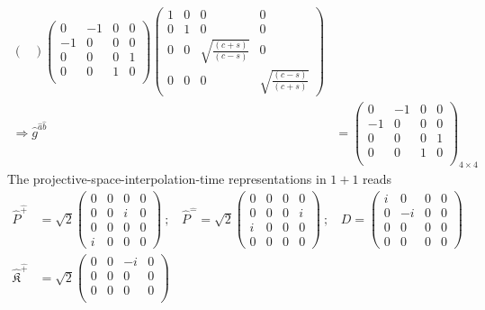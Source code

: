 \documentclass[]{article}
\numberwithin{equation}{section}
\begin{document}
{{\begin{align}
\begin{pmatrix}
    \end{pmatrix}\begin{pmatrix}
  0&-1&0&0\\
  -1&0&0&0\\
  0&0&0&1\\
  0&0&1&0\\
  \end{pmatrix}\begin{pmatrix}
     1&0&0&0\\
     0&1&0&0\\
     0&0&\sqrt{\frac{(c+s)}{(c-s)}}  & 0\\
     0&0&0 & \sqrt{\frac{(c-s)}{(c+s)}} 
    \end{pmatrix}\\
    \Longrightarrow\hat{g}^{\hat{a}\hat{b}}&=\begin{pmatrix}
  0&-1&0&0\\
  -1&0&0&0\\
  0&0&0&1\\
  0&0&1&0\\
  \end{pmatrix}_{4\times4}
\end{align}
The projective-space-interpolation-time representations in $1+1$ reads
\begin{align}
    \hat{P}^{\hat{+}}&=\sqrt{2}\begin{pmatrix}
        0&0&0&0\\
        0&0&i&0\\
        0&0&0&0\\
        i&0&0&0
    \end{pmatrix}~;~~~~\hat{P}^{\hat{-}}=\sqrt{2}\begin{pmatrix}
        0&0&0&0\\
        0&0&0&i\\
        i&0&0&0\\
        0&0&0&0
    \end{pmatrix}~;~~~~D=\begin{pmatrix}
        i&0&0&0\\
        0&-i&0&0\\
        0&0&0&0\\
        0&0&0&0
    \end{pmatrix}\nonumber\\
    \hat{\mathfrak{K}}^{\hat{+}}&=\sqrt{2}\begin{pmatrix}
        0&0&-i&0\\
        0&0&0&0\\
        0&0&0&0\\

\end{pmatrix}
\end{align}}}
\end{document}
